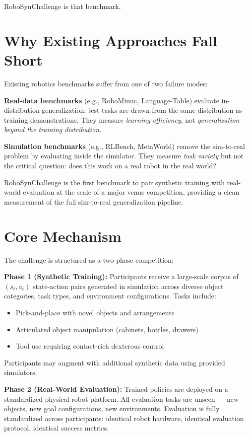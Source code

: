 \documentclass[10pt,twocolumn]{article}
\begin{document}
RoboSynChallenge is that benchmark.

\section{Why Existing Approaches Fall Short}

Existing robotics benchmarks suffer from one of two failure modes:

\textbf{Real-data benchmarks} (e.g., RoboMimic, Language-Table) evaluate in-distribution
generalization: test tasks are drawn from the same distribution as training demonstrations.
They measure \emph{learning efficiency}, not \emph{generalization beyond the training
distribution}.

\textbf{Simulation benchmarks} (e.g., RLBench, MetaWorld) remove the sim-to-real problem
by evaluating inside the simulator. They measure \emph{task variety} but not the
critical question: does this work on a real robot in the real world?

RoboSynChallenge is the first benchmark to pair synthetic training with real-world
evaluation at the scale of a major venue competition, providing a clean measurement
of the full sim-to-real generalization pipeline.

\section{Core Mechanism}

The challenge is structured as a two-phase competition:

\textbf{Phase 1 (Synthetic Training):} Participants receive a large-scale corpus of
$(s_t, a_t)$ state-action pairs generated in simulation across diverse object categories,
task types, and environment configurations. Tasks include:
\begin{itemize}[itemsep=2pt,parsep=0pt]
  \item Pick-and-place with novel objects and arrangements
  \item Articulated object manipulation (cabinets, bottles, drawers)
  \item Tool use requiring contact-rich dexterous control
\end{itemize}
Participants may augment with additional synthetic data using provided simulators.

\textbf{Phase 2 (Real-World Evaluation):} Trained policies are deployed on a
standardized physical robot platform. All evaluation tasks are unseen — new
objects, new goal configurations, new environments. Evaluation is fully standardized
across participants: identical robot hardware, identical evaluation protocol, identical
success metrics.
\end{document}
